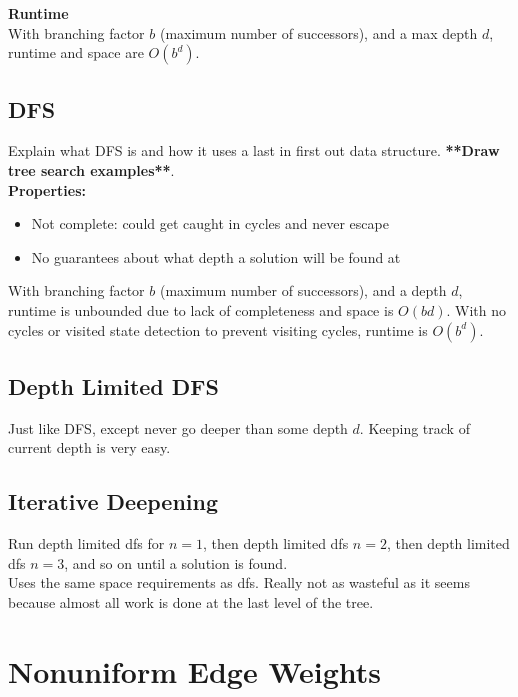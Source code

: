 \documentclass[letterpaper]{article} %
\begin{document}
\textbf{Runtime}\\

With branching factor $b$ (maximum number of successors), and a max depth $d$, runtime and space are $O(b^d)$.

\subsection{DFS}

Explain what DFS is and how it uses a last in first out data structure. \textbf{**Draw tree search examples**}.\\

\textbf{Properties:}

\begin{itemize}
	\item Not complete: could get caught in cycles and never escape
	\item No guarantees about what depth a solution will be found at
\end{itemize}

With branching factor $b$ (maximum number of successors), and a depth $d$, runtime is unbounded due to lack of completeness and space is $O(bd)$. With no cycles or visited state detection to prevent visiting cycles, runtime is $O(b^d)$.

\subsection{Depth Limited DFS}

Just like DFS, except never go deeper than some depth $d$. Keeping track of current depth is very easy.

\subsection{Iterative Deepening}

Run depth limited dfs for $n=1$, then depth limited dfs $n=2$, then depth limited dfs $n=3$, and so on until a solution is found.\\

Uses the same space requirements as dfs. Really not as wasteful as it seems because almost all work is done at the last level of the tree.

\section{Nonuniform Edge Weights}
\end{document}
